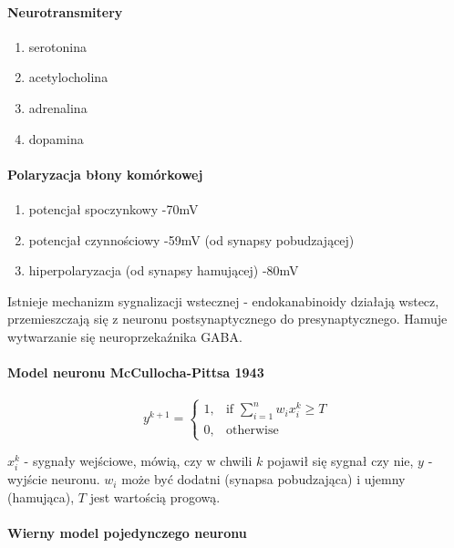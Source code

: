 \paragraph{Neurotransmitery}

\begin{enumerate}
 \item serotonina
 \item acetylocholina
 \item adrenalina
 \item dopamina
\end{enumerate}

\paragraph{Polaryzacja błony komórkowej}

\begin{enumerate}
 \item potencjał spoczynkowy -70mV
 \item potencjał czynnościowy -59mV (od synapsy pobudzającej)
 \item hiperpolaryzacja (od synapsy hamującej) -80mV
\end{enumerate}

Istnieje mechanizm sygnalizacji wstecznej - endokanabinoidy działają wstecz, przemieszczają się
z neuronu postsynaptycznego do presynaptycznego. Hamuje wytwarzanie się neuroprzekaźnika GABA.

\paragraph{Model neuronu McCullocha-Pittsa 1943}

\begin{equation}
  y^{k+1}= 
\begin{cases}
    1,& \text{if } \sum_{i=1}^n w_i x_i^k \ge T \\
    0,              & \text{otherwise}
\end{cases}
\end{equation}

$x_i^k$ - sygnały wejściowe, mówią, czy w chwili $k$ pojawił się sygnał czy nie, $y$ - wyjście neuronu.
$w_i$ może być dodatni (synapsa pobudzająca) i ujemny (hamująca), $T$ jest wartością progową.

\paragraph{Wierny model pojedynczego neuronu}

